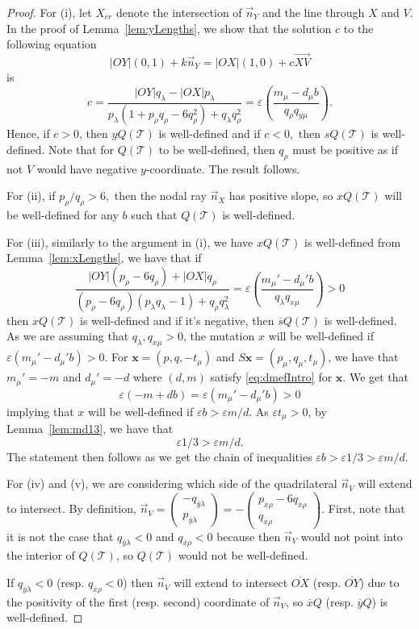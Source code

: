 \documentclass[11pt, reqno]{amsart}
\theoremstyle{remark}
\numberwithin{equation}{subsection}
\numberwithin{figure}{section}
\theoremstyle{customremark}
\newcommand{\Tt}{\mathcal{T}}
\newcommand{\vn}{{\vec{n}}}
\newcommand{\ovx}{{\ov{x}}}
\newcommand{\ovy}{{\ov{y}}}
\newcommand{\ovr}{\overrightarrow}
\newcommand{\ov}{\overline}
\newcommand{\la}{{\lambda}}
\newcommand{\eps}{\varepsilon}
\begin{document}
\begin{proof}
    For (i), let $X_{cr}$ denote the intersection of $\vn_Y$ and the line through $X$ and $V$. In the proof of Lemma~\ref{lem:yLengths}, we show that the solution $c$ to the following equation
    \[ |OY|(0,1)+k\vn_Y=|OX|(1,0)+c\ovr{XV}\]
    is 
    \[c=\frac{|OY|q_\la-|OX|p_\la}{p_\la(1+p_\rho q_\rho-6q_\rho^2)+q_\la q_\rho^2}=\eps\left(\frac{m_\mu-d_\mu b}{q_\rho q_{y\mu}}\right).\] Hence, if $c>0$, then $yQ(\Tt)$ is well-defined and if $c<0,$ then $sQ(\Tt)$ is well-defined. 
Note that for $Q(\Tt)$ to be well-defined, then $q_\rho$ must be positive as if not $V$ would have negative $y$-coordinate. The result follows. 

    For (ii), if $p_\rho/q_\rho>6,$ then the nodal ray $\vn_X$ has positive slope, so $xQ(\Tt)$ will be well-defined for any $b$ such that $Q(\Tt)$ is well-defined. 
    
    For (iii), similarly to the argument in (i), we have $xQ(\Tt)$ is well-defined from Lemma~\ref{lem:xLengths}, we have that if \[\frac{|OY|(p_\rho-6q_\rho)+|OX|q_\rho}{(p_\rho-6q_\rho)(p_\la q_\la-1)+q_\rho q_\la^2}=\eps\left(\frac{m_\mu'-d_\mu'b}{q_\la q_{x\mu}}\right)>0\]
    then $xQ(\Tt)$ is well-defined and if it's negative, then $\ov{s}Q(\Tt)$ is well-defined. As we are assuming that $q_\la,q_{x\mu}>0$, the mutation $x$ will be well-defined if $\eps (m_\mu'-d_\mu'b)>0$.  For $\bm{x}=(p,q,-t_\mu)$ and $S\bm{x}=(p_\mu,q_\mu,t_\mu)$, we have that $m_\mu'=-m$ and $d_\mu'=-d$ where $(d,m)$ satisfy \eqref{eq:dmefIntro} for $\bm{x}$. We get that
    \[ \eps(-m+db)=\eps (m_\mu'-d_\mu'b)>0\] implying that $x$ will be well-defined if $\eps b>\eps m/d$. As $\eps t_\mu>0$, by Lemma~\ref{lem:md13}, we have that
    \[ \eps 1/3>\eps m/d.\]
    The statement then follows as we get the chain of inequalities $\eps b>\eps 1/3>\eps m/d.$ 
    
    
    For (iv) and (v), we are considering which side of the quadrilateral $\vn_V$ will extend to intersect. By definition, $\vn_V=\begin{pmatrix} -q_{\ovy\la} \\ p_{\ovy\la} \end{pmatrix}=-\begin{pmatrix} p_{\ovx\rho}-6q_{\ovx\rho} \\ q_{\ovx\rho} \end{pmatrix}$. First, note that it is not the case that $q_{\ovy\la}<0$ and $q_{\ovx\rho}<0$ because then $\vn_V$ would not point into the interior of $Q(\Tt)$, so $Q(\Tt)$ would not be well-defined. 

    If $q_{\ovy\la}<0$ (resp. $q_{\ovx\rho}<0$) then $\vn_V$ will extend to intersect $\ov{OX}$  (resp. $\ov{OY}$) due to the positivity of the first (resp. second) coordinate of $\vn_V$, so $\ov{x}Q$ (resp. $\ov{y}Q$) is well-defined. 


\end{proof} 
\end{document}
